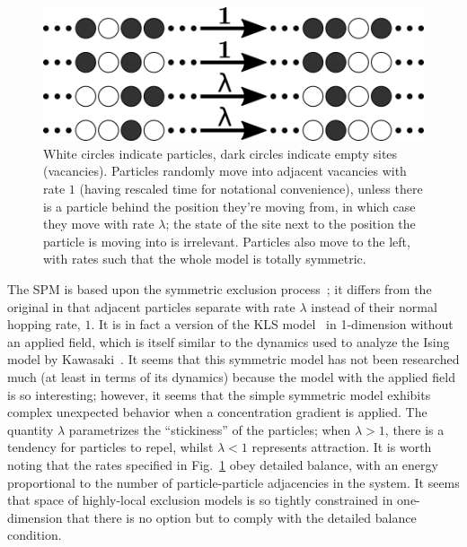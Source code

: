 \documentclass[
reprint,
 amsmath,amssymb,
 aps,
 prl,
]{revtex4-1}
\begin{document}
\begin{figure}
\vspace{1em}
\caption{\label{fig:rates} White circles indicate particles, dark circles indicate empty sites (vacancies). Particles randomly move into adjacent vacancies with rate $1$ (having rescaled time for notational convenience), unless there is a
particle behind the position they're moving from, in which case they move with rate $\lambda$; the state of the site next to the position the particle is moving into is irrelevant.
Particles also move to the left, with rates such that the whole model is totally symmetric.}
    \includegraphics[width=\linewidth]{newRates}
    \vspace{-3em}
\end{figure}
The SPM is based upon the symmetric exclusion process~\cite{sugden2007dynamically, Kollmann2003,  Lin2005, Hegde2014, Krapivsky2014, Imamura2017};
it differs from the original in that adjacent particles separate with rate $\lambda$
instead of their normal hopping rate, $1$. It is in fact a version of the KLS model~\cite{Katz1984, Zia2010} in 1-dimension without an applied field, which is itself similar to the dynamics used to analyze the Ising model by
Kawasaki~\cite{PhysRev.145.224}. It seems that this symmetric model has not been researched much (at least in terms of its dynamics) because the model with the applied field is so interesting; however, it seems that the simple symmetric model
exhibits complex unexpected behavior when a concentration gradient is applied. The quantity $\lambda$ parametrizes the ``stickiness'' of the particles; when $\lambda>1$, there is a tendency for particles to repel,
whilst $\lambda < 1$ represents attraction.
It is worth noting that the rates specified in Fig.~\ref{fig:rates} obey detailed balance,  %
with an energy proportional to the number of particle-particle adjacencies
in the system. It seems that space of highly-local exclusion models is so tightly constrained in one-dimension that there is no option but to comply with the detailed balance condition.
\end{document}
